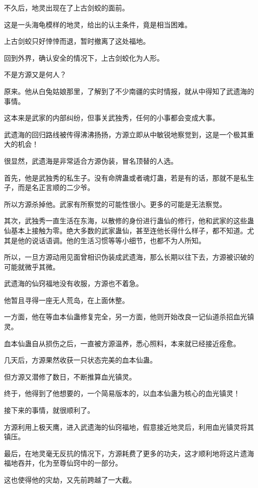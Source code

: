\begin{this_body}
不久后，地灵出现在了上古剑蛟的面前。

这是一头海龟模样的地灵，给出的认主条件，竟是相当困难。

上古剑蛟只好悻悻而退，暂时撤离了这处福地。

回到外界，确认安全的情况下，上古剑蛟化为人形。

不是方源又是何人？

原来。他从白兔姑娘那里，了解到了不少南疆的实时情报，就从中得知了武遗海的事情。

这本来是武家的内部纠纷，但事关武独秀，任何的小事都会变成大事。

武遗海的回归路线被传得沸沸扬扬，方源立即从中敏锐地察觉到，这是一个极其重大的机会！

很显然，武遗海是非常适合方源伪装，冒名顶替的人选。

首先，他是武独秀的私生子。没有命牌蛊或者魂灯蛊，若是有的话，那就不是私生子，而是名正言顺的二少爷。

所以方源杀掉他。武家有所察觉的可能性很小。更多的可能是无法察觉。

其次，武独秀一直生活在东海，以散修的身份进行蛊仙的修行，他和武家的这些蛊仙基本上接触为零。绝大多数的武家蛊仙，甚至连他长得什么样子，都不知道。尤其是他的说话语调。他的生活习惯等等小细节，也都不为人所知。

所以，一旦方源动用见面曾相识伪装成武遗海，那么长期以往下去，方源被识破的可能就微乎其微。

武遗海的仙窍福地没有收服，方源也不着急。

他暂且寻得一座无人荒岛，在上面休整。

一方面，他在等血本仙蛊修复完全，另一方面，他则开始改良一记仙道杀招血光镇灵。

血本仙蛊自从损伤之后，一直被方源温养，悉心照料，本来就已经接近痊愈。

几天后，方源果然收获一只状态完美的血本仙蛊。

但方源又潜修了数日，不断推算血光镇灵。

终于，他得到了他想要的，一个简易版本的，以血本仙蛊为核心的血光镇灵！

接下来的事情，就很顺利了。

方源利用上极天鹰，进入武遗海的仙窍福地，假意接近地灵后，利用血光镇灵将其镇压。

最后，在地灵毫无反抗的情况下，方源耗费了更多的功夫，这才顺利地将这片遗海福地吞并，化为至尊仙窍中的一部分。

这也使得他的灾劫，又先前跨越了一大截。


\end{this_body}
